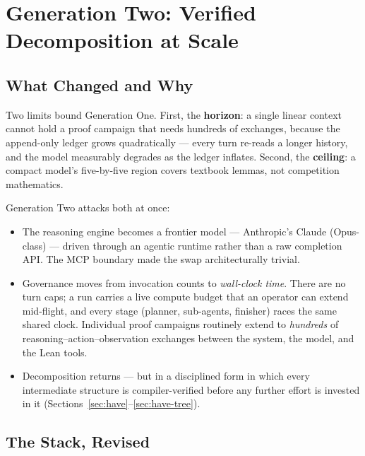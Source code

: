 \documentclass[12pt, a4paper]{article}
\begin{document}
\section{Generation Two: Verified Decomposition at Scale}
\label{sec:gen2-arch}

\subsection{What Changed and Why}

Two limits bound Generation One. First, the \textbf{horizon}: a single
linear context cannot hold a proof campaign that needs hundreds of
exchanges, because the append-only ledger grows quadratically ---
every turn re-reads a longer history, and the model measurably degrades as
the ledger inflates. Second, the \textbf{ceiling}: a compact model's
five-by-five region covers textbook lemmas, not competition mathematics.

Generation Two attacks both at once:

\begin{itemize}[leftmargin=*]
  \item The reasoning engine becomes a frontier model --- Anthropic's Claude
    (Opus-class) --- driven through an agentic runtime rather than a raw
    completion API. The MCP boundary made the swap architecturally trivial.
  \item Governance moves from invocation counts to \emph{wall-clock time}.
    There are no turn caps; a run carries a live compute budget that an
    operator can extend mid-flight, and every stage (planner, sub-agents,
    finisher) races the same shared clock. Individual proof campaigns
    routinely extend to \emph{hundreds} of reasoning--action--observation
    exchanges between the system, the model, and the Lean tools.
  \item Decomposition returns --- but in a disciplined form in which every
    intermediate structure is compiler-verified before any further effort is
    invested in it (Sections~\ref{sec:have}--\ref{sec:have-tree}).
\end{itemize}

\subsection{The Stack, Revised}
\end{document}

